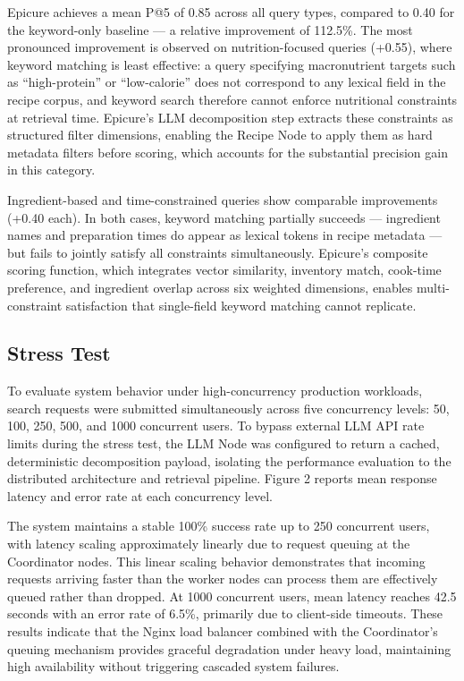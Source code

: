 \documentclass[conference]{IEEEtran}
\begin{document}
Epicure achieves a mean P@5 of 0.85 across all query types, compared to 0.40 for the keyword-only baseline --- a relative improvement of 112.5\%. The most pronounced improvement is observed on nutrition-focused queries (+0.55), where keyword matching is least effective: a query specifying macronutrient targets such as ``high-protein'' or ``low-calorie'' does not correspond to any lexical field in the recipe corpus, and keyword search therefore cannot enforce nutritional constraints at retrieval time. Epicure's LLM decomposition step extracts these constraints as structured filter dimensions, enabling the Recipe Node to apply them as hard metadata filters before scoring, which accounts for the substantial precision gain in this category.

Ingredient-based and time-constrained queries show comparable improvements (+0.40 each). In both cases, keyword matching partially succeeds --- ingredient names and preparation times do appear as lexical tokens in recipe metadata --- but fails to jointly satisfy all constraints simultaneously. Epicure's composite scoring function, which integrates vector similarity, inventory match, cook-time preference, and ingredient overlap across six weighted dimensions, enables multi-constraint satisfaction that single-field keyword matching cannot replicate.

\subsection{Stress Test}
To evaluate system behavior under high-concurrency production workloads, search requests were submitted simultaneously across five concurrency levels: 50, 100, 250, 500, and 1000 concurrent users. To bypass external LLM API rate limits during the stress test, the LLM Node was configured to return a cached, deterministic decomposition payload, isolating the performance evaluation to the distributed architecture and retrieval pipeline. Figure 2 reports mean response latency and error rate at each concurrency level.

The system maintains a stable 100\% success rate up to 250 concurrent users, with latency scaling approximately linearly due to request queuing at the Coordinator nodes. This linear scaling behavior demonstrates that incoming requests arriving faster than the worker nodes can process them are effectively queued rather than dropped. At 1000 concurrent users, mean latency reaches 42.5 seconds with an error rate of 6.5\%, primarily due to client-side timeouts. These results indicate that the Nginx load balancer combined with the Coordinator's queuing mechanism provides graceful degradation under heavy load, maintaining high availability without triggering cascaded system failures.
\end{document}

